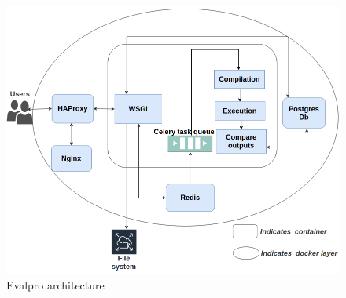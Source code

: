 \documentclass[sigconf]{acmart}
\begin{document}
\begin{figure}[h]
  \centering
  \includegraphics[width=\linewidth]{Pictures/architecture_10.png}
  \caption{Evalpro architecture}
  \label{evalpro_architecture}
\end{figure}
\end{document}
